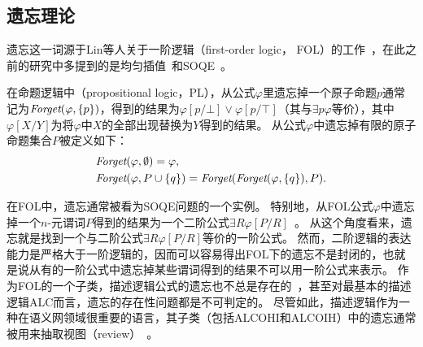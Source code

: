 \subsection{遗忘理论}\label{chapter01:forgetting}
遗忘这一词源于Lin等人关于一阶逻辑（first-order logic， FOL）的工作~\cite{lin1994forget}，在此之前的研究中多提到的是均匀插值~\cite{visser1996uniform,konev2009forgetting}和SOQE~\cite{ackermann1935untersuchungen}。

在命题逻辑中（propositional logic，PL），从公式$\varphi$里遗忘掉一个原子命题$p$通常记为$\textit{Forget}(\varphi,\{p\})$，得到的结果为$\varphi[p/\bot] \vee \varphi[p/\top]$（其与$\exists p\varphi$等价），其中$\varphi[X/Y]$为将$\varphi$中$X$的全部出现替换为$Y$得到的结果。
从公式$\varphi$中遗忘掉有限的原子命题集合$P$被定义如下：
\begin{alignat*}{2}
	&  \Forget(\varphi, \emptyset) = \varphi, \qquad \\ %
	&  \Forget(\varphi, P \cup \{q\})  = \Forget(\Forget(\varphi, \{q\}), P).
	\nonumber
\end{alignat*}

在FOL中，遗忘通常被看为SOQE问题的一个实例。
特别地，从FOL公式$\varphi$中遗忘掉一个$n$-元谓词$P$得到的结果为一个二阶公式$\exists R \varphi[P/R]$~\cite{lin1994forget}。
从这个角度看来，遗忘就是找到一个与二阶公式$\exists R \varphi[P/R]$等价的一阶公式。
然而，二阶逻辑的表达能力是严格大于一阶逻辑的，因而可以容易得出FOL下的遗忘不是封闭的，也就是说从有的一阶公式中遗忘掉某些谓词得到的结果不可以用一阶公式来表示。
作为FOL的一个子类，描述逻辑公式的遗忘也不总是存在的~\cite{DBLP:journals/ai/KonevL0W13}，甚至对最基本的描述逻辑{\cal ALC}而言，遗忘的存在性问题都是不可判定的。
尽管如此，描述逻辑作为一种在语义网领域很重要的语言，其子类（包括{\cal ALCOHI}和{\cal ALCOIH}）中的遗忘通常被用来抽取视图（review）~\cite{Wang:AMAI:2010,DBLP:conf/ijcai/LutzW11,Konev:JAIR:2012,DBLP:conf/ijcai/ZhaoS17,DBLP:conf/aaai/ZhaoSWZF20}。

